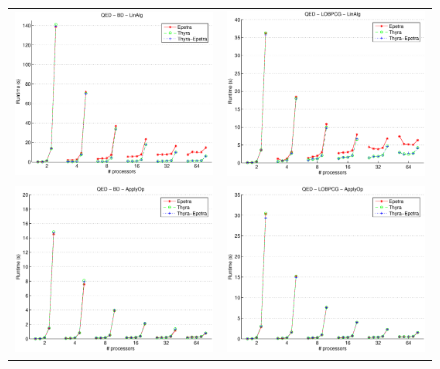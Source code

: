 \documentclass[10pt]{article}
\begin{document}
\begin{figure}[htp]
\begin{tabular}{cc}
\includegraphics[width=2.50in]{results/qed/QED-BD-LinAlg_ln.eps} &
\includegraphics[width=2.50in]{results/qed/QED-LOBPCG-LinAlg_ln.eps} \\
\includegraphics[width=2.50in]{results/qed/QED-BD-ApplyOp_ln.eps} &
\includegraphics[width=2.50in]{results/qed/QED-LOBPCG-ApplyOp_ln.eps} \\

\end{tabular}
\end{figure}
\end{document}
